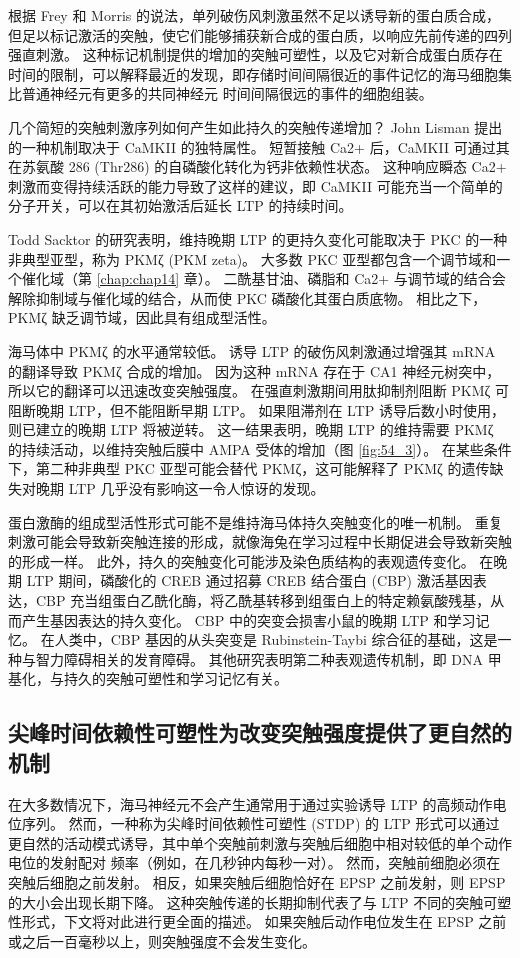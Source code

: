 根据 Frey 和 Morris 的说法，单列破伤风刺激虽然不足以诱导新的蛋白质合成，但足以标记激活的突触，使它们能够捕获新合成的蛋白质，以响应先前传递的四列 强直刺激。 这种标记机制提供的增加的突触可塑性，以及它对新合成蛋白质存在时间的限制，可以解释最近的发现，即存储时间间隔很近的事件记忆的海马细胞集比普通神经元有更多的共同神经元 时间间隔很远的事件的细胞组装。

几个简短的突触刺激序列如何产生如此持久的突触传递增加？ John Lisman 提出的一种机制取决于 CaMKII 的独特属性。 短暂接触 Ca2+ 后，CaMKII 可通过其在苏氨酸 286 (Thr286) 的自磷酸化转化为钙非依赖性状态。 这种响应瞬态 Ca2+ 刺激而变得持续活跃的能力导致了这样的建议，即 CaMKII 可能充当一个简单的分子开关，可以在其初始激活后延长 LTP 的持续时间。

Todd Sacktor 的研究表明，维持晚期 LTP 的更持久变化可能取决于 PKC 的一种非典型亚型，称为 PKMζ (PKM zeta)。 大多数 PKC 亚型都包含一个调节域和一个催化域（第 \ref{chap:chap14} 章）。 二酰基甘油、磷脂和 Ca2+ 与调节域的结合会解除抑制域与催化域的结合，从而使 PKC 磷酸化其蛋白质底物。 相比之下，PKMζ 缺乏调节域，因此具有组成型活性。

海马体中 PKMζ 的水平通常较低。 诱导 LTP 的破伤风刺激通过增强其 mRNA 的翻译导致 PKMζ 合成的增加。 因为这种 mRNA 存在于 CA1 神经元树突中，所以它的翻译可以迅速改变突触强度。 在强直刺激期间用肽抑制剂阻断 PKMζ 可阻断晚期 LTP，但不能阻断早期 LTP。 如果阻滞剂在 LTP 诱导后数小时使用，则已建立的晚期 LTP 将被逆转。 这一结果表明，晚期 LTP 的维持需要 PKMζ 的持续活动，以维持突触后膜中 AMPA 受体的增加（图 \ref{fig:54_3}）。 在某些条件下，第二种非典型 PKC 亚型可能会替代 PKMζ，这可能解释了 PKMζ 的遗传缺失对晚期 LTP 几乎没有影响这一令人惊讶的发现。

蛋白激酶的组成型活性形式可能不是维持海马体持久突触变化的唯一机制。 重复刺激可能会导致新突触连接的形成，就像海兔在学习过程中长期促进会导致新突触的形成一样。 此外，持久的突触变化可能涉及染色质结构的表观遗传变化。 在晚期 LTP 期间，磷酸化的 CREB 通过招募 CREB 结合蛋白 (CBP) 激活基因表达，CBP 充当组蛋白乙酰化酶，将乙酰基转移到组蛋白上的特定赖氨酸残基，从而产生基因表达的持久变化。 CBP 中的突变会损害小鼠的晚期 LTP 和学习记忆。 在人类中，CBP 基因的从头突变是 Rubinstein-Taybi 综合征的基础，这是一种与智力障碍相关的发育障碍。 其他研究表明第二种表观遗传机制，即 DNA 甲基化，与持久的突触可塑性和学习记忆有关。

\subsection{尖峰时间依赖性可塑性为改变突触强度提供了更自然的机制}
在大多数情况下，海马神经元不会产生通常用于通过实验诱导 LTP 的高频动作电位序列。 然而，一种称为尖峰时间依赖性可塑性 (STDP) 的 LTP 形式可以通过更自然的活动模式诱导，其中单个突触前刺激与突触后细胞中相对较低的单个动作电位的发射配对 频率（例如，在几秒钟内每秒一对）。 然而，突触前细胞必须在突触后细胞之前发射。 相反，如果突触后细胞恰好在 EPSP 之前发射，则 EPSP 的大小会出现长期下降。 这种突触传递的长期抑制代表了与 LTP 不同的突触可塑性形式，下文将对此进行更全面的描述。 如果突触后动作电位发生在 EPSP 之前或之后一百毫秒以上，则突触强度不会发生变化。

